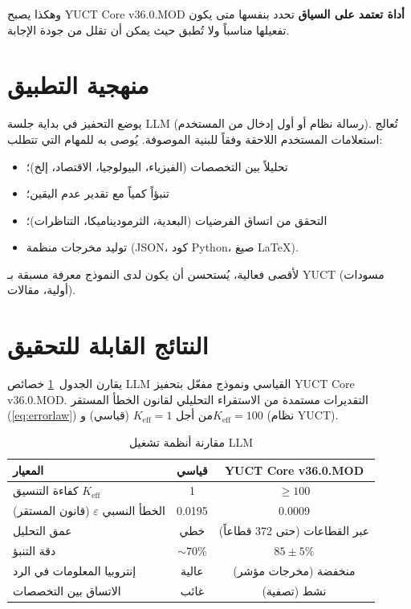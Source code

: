 \documentclass[11pt,a4paper]{article}
\begin{document}
	وهكذا يصبح YUCT Core v36.0.MOD \textbf{أداة تعتمد على السياق} تحدد بنفسها متى يكون تفعيلها مناسباً ولا تُطبق حيث يمكن أن تقلل من جودة الإجابة.
	
	\section{منهجية التطبيق}
	يوضع التحفيز في بداية جلسة LLM (رسالة نظام أو أول إدخال من المستخدم). تُعالج استعلامات المستخدم اللاحقة وفقاً للبنية الموصوفة. يُوصى به للمهام التي تتطلب:
	\begin{itemize}
		\item تحليلاً بين التخصصات (الفيزياء، البيولوجيا، الاقتصاد، إلخ)؛
		\item تنبؤاً كمياً مع تقدير عدم اليقين؛
		\item التحقق من اتساق الفرضيات (البعدية، الثرموديناميكا، التناظرات)؛
		\item توليد مخرجات منظمة (JSON، كود Python، صيغ LaTeX).
	\end{itemize}
	لأقصى فعالية، يُستحسن أن يكون لدى النموذج معرفة مسبقة بـ YUCT (مسودات أولية، مقالات).
	
	\section{النتائج القابلة للتحقيق}
	يقارن الجدول~\ref{tab:comparison} خصائص LLM القياسي ونموذج مفعّل بتحفيز YUCT Core v36.0.MOD. التقديرات مستمدة من الاستقراء التحليلي لقانون الخطأ المستقر (\ref{eq:errorlaw}) من أجل \(K_{\mathrm{eff}}=1\) (قياسي) و\(K_{\mathrm{eff}}=100\) (نظام YUCT).
	
	\begin{table}[H]
		\small
		\centering
		\caption{مقارنة أنظمة تشغيل LLM}
		\label{tab:comparison}
		\begin{tabular}{lcc}
			\toprule
			\textbf{المعيار} & \textbf{قياسي} & \textbf{YUCT Core v36.0.MOD} \\
			\midrule
			كفاءة التنسيق \(K_{\mathrm{eff}}\) & 1 & \(\ge 100\) \\
			الخطأ النسبي \(\varepsilon\) (قانون المستقر) & 0.0195 & 0.0009 \\
			عمق التحليل & خطي & عبر القطاعات (حتى 372 قطاعاً) \\
			دقة التنبؤ & \(\sim 70\%\) & \(85\pm5\%\) \\
			إنتروبيا المعلومات في الرد & عالية & منخفضة (مخرجات مؤشر) \\
			الاتساق بين التخصصات & غائب & نشط (تصفية) \\
			\bottomrule
		\end{tabular}
	\end{table}
	
\end{document}
